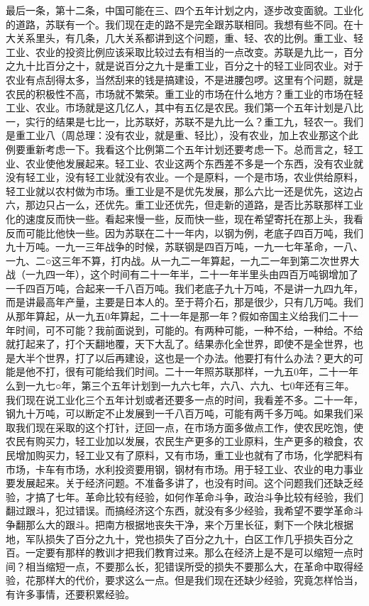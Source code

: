 最后一条，第十二条，中国可能在三、四个五年计划之内，逐步改变面貌。工业化的道路，苏联有一个。我们现在走的路不是完全跟苏联相同。我想有些不同。在十大关系里头，有几条，几大关系都讲到这个问题，重、轻、农的比例。重工业、轻工业、农业的投资比例应该采取比较过去有相当的一点改变。苏联是九比一，百分之九十比百分之十，就是说百分之九十是重工业，百分之十的轻工业同农业。对于农业有点刮得太多，当然刮来的钱是搞建设，不是进腰包啰。这里有个问题，就是农民的积极性不高，市场就不繁荣。重工业的市场在什么地方？重工业的市场在轻工业、农业。市场就是这几亿人，其中有五亿是农民。我们第一个五年计划是八比一，实行的结果是七比一，比苏联好，苏联不是九比一么？重工九，轻农一。我们是重工业八（周总理：没有农业，就是重、轻比），没有农业，加上农业那这个此例要重新考虑一下。我看这个比例第二个五年计划还要考虑一下。总而言之，轻工业、农业使他发展起来。轻工业、农业这两个东西差不多是一个东西，没有农业就没有轻工业，没有轻工业就没有农业。一个是原料，一个是市场，农业供给原料，轻工业就以农村做为市场。重工业是不是优先发展，那么六比一还是优先，这边占六，那边只占一么，还优先。重工业还优先，但走新的道路，是否比苏联那样工业化的速度反而快一些。看起来慢一些，反而快一些，现在希望寄托在那上头，我看反而可能比他快一些。因为苏联在二十一年内，以钢为例，老底子四百万吨，我们九十万吨。一九一三年战争的时候，苏联钢是四百万吨，一九一七年革命，一八、一九、二○这三年不算，打内战。从一九二一年算起，一九二一年到第二次世界大战（一九四一年），这个时间有二十一年半，二十一年半里头由四百万吨钢增加了一千四百万吨，合起来一千八百万吨。我们老底子九十万吨，不是讲一九四九年，而是讲最高年产量，主要是日本人的。至于蒋介石，那是很少，只有几万吨。我们从那年算起，从一九五0年算起，二十一年是那一年？假如帝国主义给我们二十一年时间，可不可能？我前面说到，可能的。有两种可能，一种不给，一种给。不给就打起来了，打个天翻地覆，天下大乱了。结果赤化全世界，即使不是全世界，也是大半个世界，打了以后再建设，这也是一个办法。他要打有什么办法？更大的可能是他不打，很有可能给我们时间。二十一年照苏联那样，一九五0年，二十一年么到一九七○年，第三个五年计划到一九六七年，六八、六九、七0年还有三年。我们现在说工业化三个五年计划或者还要多一点的时间，我看差不多。二十一年，钢九十万吨，可以断定不止发展到一千八百万吨，可能有两千多万吨。如果我们采取我们现在采取的这个打针，迂回一点，在市场方面多做点工作，使农民吃饱，使农民有购买力，轻工业加以发展，农民生产更多的工业原料，生产更多的粮食，农民增加购买力，轻工业又有了原料，又有市场，重工业也就有了市场，化学肥料有市场，卡车有市场，水利投资要用钢，钢材有市场。用于轻工业、农业的电力事业要发展起来。关于经济问题。不准备多讲了，也没有时间。这个问题我们还缺乏经验，才搞了七年。革命比较有经验，如何作革命斗争，政治斗争比较有经验，我们翻过跟斗，犯过错误。而搞经济这个东西，就没有多少经验，我希望不要学革命斗争翻那么大的跟斗。把南方根据地丧失干净，来个万里长征，剩下一个陕北根据地，军队损失了百分之九十，党也损失了百分之九十，白区工作几乎损失百分之百。一定要有那样的教训才把我们教育过来。那么在经济上是不是可以缩短一点时间？相当缩短一点，不要那么长，犯错误所受的损失不要那么大，在革命中取得经验，花那样大的代价，要求这么一点。但是我们现在还缺少经验，究竟怎样恰当，有许多事情，还要积累经验。

